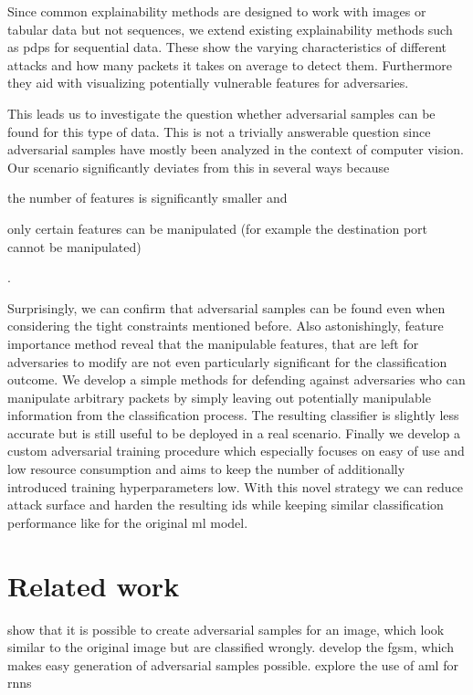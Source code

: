 \documentclass[conference]{IEEEtran}
\begin{document}
Since common explainability methods are designed to work with images or tabular data but not sequences, we extend existing explainability methods such as \glspl{pdp} \cite{friedman_greedy_2001} for sequential data. These show the varying characteristics of different attacks and how many packets it takes on average to detect them. Furthermore they aid with visualizing potentially vulnerable features for adversaries. 

This leads us to investigate the question whether adversarial samples can be found for this type of data. This is not a trivially answerable question since adversarial samples have mostly been analyzed in the context of computer vision. Our scenario significantly deviates from this in several ways because \begin{enumerate*}
\item the number of features is significantly smaller and
\item only certain features can be manipulated (for example the destination port cannot be manipulated)
\end{enumerate*}.

Surprisingly, we can confirm that adversarial samples can be found even when considering the tight constraints mentioned before. Also astonishingly, feature importance method reveal that the manipulable features, that are left for adversaries to modify are not even particularly significant for the classification outcome. %
We develop a simple methods for defending against adversaries who can manipulate arbitrary packets by simply leaving out potentially manipulable information from the classification process. The resulting classifier is slightly less accurate but is still useful to be deployed in a real scenario. Finally we develop a custom adversarial training procedure which especially focuses on easy of use and low resource consumption and aims to keep the number of additionally introduced training hyperparameters low. With this novel strategy we can reduce attack surface and harden the resulting \gls{ids} while keeping similar classification performance like for the original \gls{ml} model.

\section{Related work}

\cite{szegedy_intriguing_2014} show that it is possible to create adversarial samples for an image, which look similar to the original image but are classified wrongly. \cite{goodfellow_explaining_2015} develop the \gls{fgsm}, which makes easy generation of adversarial samples possible.
\cite{papernot_crafting_2016} explore the use of \gls{aml} for \glspl{rnn}
\end{document}
